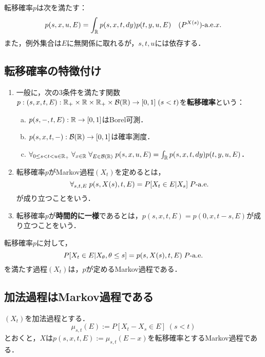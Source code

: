 \documentclass[uplatex,dvipdfmx]{jsreport}
\begin{document}
\begin{lemma}
    転移確率$p$は次を満たす：
    \[p(s,x,u,E)=\int_{\mathbb{R}} p(s,x,t,dy)p(t,y,u,E)\quad(P^{X(s)})\text{-a.e.} x.\]
    また，例外集合は$E$に無関係に取れるが，$s,t,u$には依存する．
\end{lemma}

\subsection{転移確率の特徴付け}

\begin{definition}\mbox{}
    \begin{enumerate}
        \item 一般に，次の3条件を満たす関数$p:(s,x,t,E):\mathbb{R}_+\times\mathbb{R}\times\mathbb{R}_+\times\mathcal{B}(\mathbb{R})\to[0,1]\;(s<t)$を\textbf{転移確率}という：
        \begin{enumerate}[(a)]
            \item $p(s,-,t,E):\mathbb{R}\to[0,1]$はBorel可測．
            \item $p(s,x,t,-):\mathcal{B}(\mathbb{R})\to[0,1]$は確率測度．
            \item $\forall_{0\le s<t<u\in\mathbb{R}_+}\;\forall_{x\in\mathbb{R}}\;\forall_{E\in\mathcal{B}(\mathbb{R})}\;p(s,x,u,E)=\int_{\mathbb{R}} p(s,x,t,dy)p(t,y,u,E)$．
        \end{enumerate}
        \item 転移確率$p$がMarkov過程$(X_t)$を定めるとは，
        \[\forall_{s,t,E}\;p(s,X(s),t,E)=P[X_t\in E|X_s]\;P\text{-a.e.}\]
        が成り立つことをいう．
        \item 転移確率$p$が\textbf{時間的に一様}であるとは，$p(s,x,t,E)=p(0,x,t-s,E)$が成り立つことをいう．
    \end{enumerate}
\end{definition}

\begin{lemma}
    転移確率$p$に対して，
    \[P[X_t\in E|X_\theta,\theta\le s]=p(s,X(s),t,E)\;P\text{-a.e.}\]
    を満たす過程$(X_t)$は，$p$が定めるMarkov過程である．
\end{lemma}

\subsection{加法過程はMarkov過程である}

\begin{theorem}
    $(X_t)$を加法過程とする．
    \[\mu_{s,t}(E):=P[X_t-X_s\in E]\;(s<t)\]
    とおくと，$X$は$p(s,x,t,E):=\mu_{s,t}(E-x)$を転移確率とするMarkov過程である．
\end{theorem}
\end{document}
